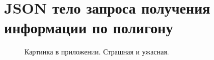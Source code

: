 \chapter{JSON тело запроса получения информации по полигону}
\label{cha:polygon}

\begin{figure}
	\centering
	\caption{Картинка в приложении. Страшная и ужасная.}
\end{figure}